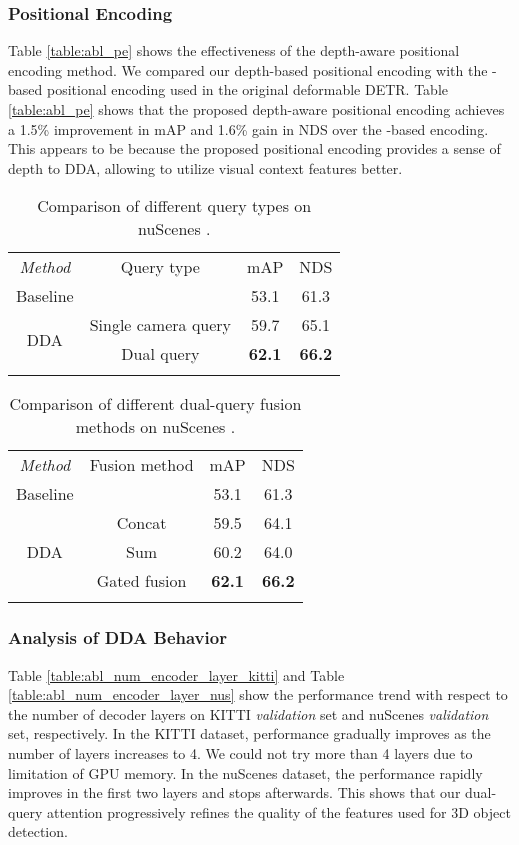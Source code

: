 \documentclass[lettersize,journal]{IEEEtran}
\begin{document}
\subsubsection{Positional Encoding}
Table \ref{table:abl_pe} shows the effectiveness of the depth-aware positional encoding method. We compared our depth-based positional encoding with the -based positional encoding used in the original deformable DETR. Table \ref{table:abl_pe} shows that the proposed depth-aware positional encoding achieves a 1.5\% improvement in mAP and 1.6\% gain in NDS over the -based encoding. This appears to be because the proposed positional encoding provides a sense of depth to DDA, allowing to  utilize visual context features better.



\begin{table}[t]
\centering
\caption{Comparison of different query types on nuScenes .}
\begin{tabular}{cccc}
\cline{1-4}
\textit{Method}    & Query type      & mAP  & NDS  \\
\cline{1-4}
Baseline\cite{centerpoint}& & 53.1 & 61.3 \\
\cline{1-4}
\multirow{2}{*}{DDA}  
         & Single camera query    & 59.7 & 65.1 \\
& Dual query     & \textbf{62.1} & \textbf{66.2}\\

\cline{1-4}
\label{table:abl_query_type}
\end{tabular}
\end{table} 
\begin{table}[t]
\centering
\caption{Comparison of different dual-query fusion methods on nuScenes . }
\begin{tabular}{cccc}
\cline{1-4}
\textit{Method}    & Fusion method      & mAP  & NDS  \\
\cline{1-4}
Baseline\cite{centerpoint}& & 53.1 & 61.3 \\
\cline{1-4}
\multirow{3}{*}{DDA}  
         & Concat    & 59.5 & 64.1 \\
        &Sum        & 60.2 & 64.0 \\
                &Gated fusion     & \textbf{62.1} & \textbf{66.2}\\

\cline{1-4}
\label{table:abl_dda_fm}
\end{tabular}
\end{table}
 \subsubsection{Analysis of DDA Behavior}
Table \ref{table:abl_num_encoder_layer_kitti} and Table \ref{table:abl_num_encoder_layer_nus} show the performance trend with respect to the number of decoder layers on KITTI {\it validation} set and nuScenes {\it validation} set, respectively. In the KITTI dataset, performance gradually improves as the number of layers increases to 4. We could not try more than 4 layers due to limitation of GPU memory. In the nuScenes dataset, the performance rapidly improves in the first two layers and stops afterwards. This shows that our dual-query attention progressively refines the quality of the features used for 3D object detection.  
\end{document}

